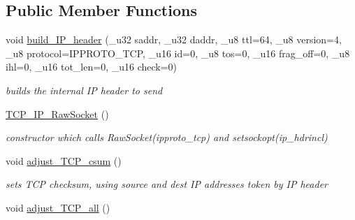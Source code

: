 \subsection*{Public Member Functions}
\begin{CompactItemize}
\item 
\hypertarget{classsocketpp_1_1TCP__IP__RawSocket_10edb8c09e89f09c0b99b5b2febce821}{
void \hyperlink{classsocketpp_1_1TCP__IP__RawSocket_10edb8c09e89f09c0b99b5b2febce821}{build\_\-IP\_\-header} (\_\-u32 saddr, \_\-u32 daddr, \_\-u8 ttl=64, \_\-u8 version=4, \_\-u8 protocol=IPPROTO\_\-TCP, \_\-u16 id=0, \_\-u8 tos=0, \_\-u16 frag\_\-off=0, \_\-u8 ihl=0, \_\-u16 tot\_\-len=0, \_\-u16 check=0)}
\label{classsocketpp_1_1TCP__IP__RawSocket_10edb8c09e89f09c0b99b5b2febce821}

\begin{CompactList}\small\item\em builds the internal IP header to send \item\end{CompactList}\item 
\hypertarget{classsocketpp_1_1TCP__IP__RawSocket_1b08f12274fd9590f805bc876c44edd9}{
\hyperlink{classsocketpp_1_1TCP__IP__RawSocket_1b08f12274fd9590f805bc876c44edd9}{TCP\_\-IP\_\-RawSocket} ()}
\label{classsocketpp_1_1TCP__IP__RawSocket_1b08f12274fd9590f805bc876c44edd9}

\begin{CompactList}\small\item\em constructor which calls RawSocket(ipproto\_\-tcp) and setsockopt(ip\_\-hdrincl) \item\end{CompactList}\item 
\hypertarget{classsocketpp_1_1TCP__IP__RawSocket_c203b188308532333bdf53a4e18bc230}{
void \hyperlink{classsocketpp_1_1TCP__IP__RawSocket_c203b188308532333bdf53a4e18bc230}{adjust\_\-TCP\_\-csum} ()}
\label{classsocketpp_1_1TCP__IP__RawSocket_c203b188308532333bdf53a4e18bc230}

\begin{CompactList}\small\item\em sets TCP checksum, using source and dest IP addresses token by IP header \item\end{CompactList}\item 
\hypertarget{classsocketpp_1_1TCP__IP__RawSocket_3644327ff72d322ff809ac432f59783b}{
void \hyperlink{classsocketpp_1_1TCP__IP__RawSocket_3644327ff72d322ff809ac432f59783b}{adjust\_\-TCP\_\-all} ()}
\label{classsocketpp_1_1TCP__IP__RawSocket_3644327ff72d322ff809ac432f59783b}


\end{CompactItemize}
